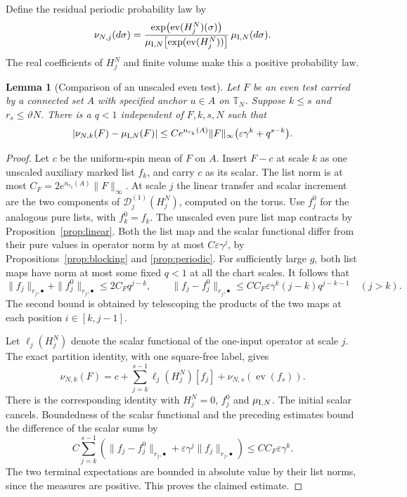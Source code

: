 \documentclass[11pt]{article}
\newtheorem{lemma}[proposition]{Lemma}
\theoremstyle{definition}
\begin{document}
Define the residual periodic probability law by
\[
 \nu_{N,j}(d\sigma)=
 \frac{\exp\bigl(\operatorname{ev}(H_j^N)(\sigma)\bigr)}
      {\mu_{{\rm I},N}\bigl[\exp(\operatorname{ev}(H_j^N))\bigr]}
 \,\mu_{{\rm I},N}(d\sigma).
\]
The real coefficients of \(H_j^N\) and finite volume make this a
positive probability law.

\begin{lemma}[Comparison of an unscaled even test]
\label{lem:terminal-test}
Let \(F\) be an even test carried by a connected set \(A\)
with specified anchor \(u\in A\) on \(\mathbb T_N\).
Suppose \(k\le s\) and \(r_s\le\vartheta N\).
There is a \(q<1\) independent of \(F,k,s,N\) such that
\[
 |\nu_{N,k}(F)-\mu_{{\rm I},N}(F)|
 \le C e^{n_{r_k}(A)}\|F\|_\infty
        \bigl(\varepsilon\gamma^k+q^{s-k}\bigr).
\]
\end{lemma}

\begin{proof}
Let \(c\) be the uniform-spin mean of \(F\) on \(A\).
Insert \(F-c\) at scale \(k\) as one unscaled auxiliary
marked list \(f_k\), and carry \(c\) as its scalar.
The list norm is at most
\(C_F=2e^{n_{r_k}(A)}\|F\|_\infty\).
At scale \(j\) the linear transfer and scalar increment are
the two components of
\(\mathcal D_j^{(1)}(H_j^N)\), computed on the torus.
Use \(f_j^0\) for the analogous pure lists, with
\(f_k^0=f_k\). The unscaled even pure list map contracts
by Proposition~\ref{prop:linear}. Both the list map and
the scalar functional differ from their pure values in
operator norm by at most \(C\varepsilon\gamma^j\), by
Propositions~\ref{prop:blocking} and \ref{prop:periodic}.
For sufficiently large \(g\), both list maps have norm
at most some fixed \(q<1\) at all the chart scales.
It follows that
\[
 \|f_j\|_{r_j,\bullet}+\|f_j^0\|_{r_j,\bullet}
 \le 2C_F q^{j-k},\qquad
 \|f_j-f_j^0\|_{r_j,\bullet}
 \le C C_F\varepsilon\gamma^k(j-k)q^{j-k-1}\quad(j>k).
\]
The second bound is obtained by telescoping the products of
the two maps at each position \(i\in[k,j-1]\).

Let \(\ell_j(H_j^N)\) denote the scalar functional of the
one-input operator at scale \(j\).
The exact partition identity, with one square-free label,
gives
\[
 \nu_{N,k}(F)=c+
 \sum_{j=k}^{s-1}\ell_j(H_j^N)[f_j]
 +\nu_{N,s}(\operatorname{ev}(f_s)).
\]
There is the corresponding identity with \(H_j^N=0\),
\(f_j^0\) and \(\mu_{{\rm I},N}\).
The initial scalar cancels. Boundedness of the scalar
functional and the preceding estimates bound the difference
of the scalar sums by
\[
 C\sum_{j=k}^{s-1}
   \left(\|f_j-f_j^0\|_{r_j,\bullet}
          +\varepsilon\gamma^j\|f_j\|_{r_j,\bullet}\right)
 \le C C_F\varepsilon\gamma^k.
\]
The two terminal expectations are bounded in absolute value
by their list norms, since the measures are positive.
This proves the claimed estimate.
\end{proof}
\end{document}

